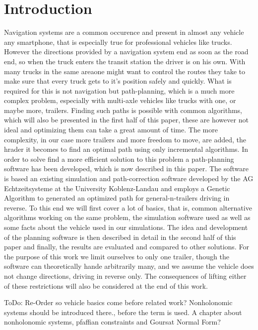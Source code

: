\chapter{Introduction}
\label{cha:introduction}

Navigation systems are a common occurence and present in almost any vehicle any smartphone, that is especially true for professional vehicles like trucks. However the directions provided by a navigation system end as soon as the road end, so when the truck enters the transit station the driver is on his own. With many trucks in the same areaone might want to control the routes they take to make sure that every truck gets to it's position safely and quickly. What is required for this is not navigation but path-planning, which is a much more complex problem, especially with multi-axle vehicles like trucks with one, or maybe more, trailers. Finding such paths is possible with common algorithms, which will also be presented in the first half of this paper, these are however not ideal and optimizing them can take a great amount of time. The more complexity, in our case more trailers and more freedom to move, are added, the hrader it becomes to find an optimal path using only incremental algorithms. In order to solve find a more efficient solution to this problem a path-planning software has been developed, which is now described in this paper. The software is based an existing simulation and path-correction software developed by the AG Echtzeitsysteme at the University Koblenz-Landau and employs a Genetic Algorithm to generated an optimized path for general-n-trailers driving in reverse. 
To this end we will first cover a lot of basics, that is, common alternative algorithms working on the same problem, the simulation software used as well as some facts about the vehicle used in our simulations. The idea and development of the planning software is then described in detail in the second half of this paper and finally, the results are evaluated and compared to other solutions. For the purpose of this work we limit ourselves to only one trailer, though the software can theoretically hande arbitrarily many, and we assume the vehicle does not change directions, driving in reverse only. The consequences of lifting either of these restrictions will also be considered at the end of this work.




ToDo: Re-Order so vehicle basics come before related work? Nonholonomic systems should be introduced there., before the term is used.
			A chapter about nonholonomic systems, pfaffian constraints and Goursat Normal Form?

